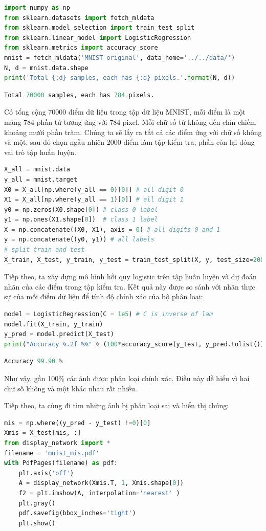 \begin{lstlisting}[language=Python]
import numpy as np 
from sklearn.datasets import fetch_mldata
from sklearn.model_selection import train_test_split
from sklearn.linear_model import LogisticRegression 
from sklearn.metrics import accuracy_score
mnist = fetch_mldata('MNIST original', data_home='../../data/')
N, d = mnist.data.shape
print('Total {:d} samples, each has {:d} pixels.'.format(N, d))
\end{lstlisting}
\kq 
\begin{lstlisting}[language=Python]
Total 70000 samples, each has 784 pixels.
\end{lstlisting}

Có tổng cộng 70000 điểm dữ liệu trong tập dữ liệu MNIST, mỗi điểm là một mảng
784 phần tử tương ứng với 784 pixel. Mỗi chữ số từ không đến chín chiếm khoảng
mười phần trăm. Chúng ta sẽ lấy ra tất cả các điểm ứng với chữ số không và một,
sau đó chọn ngẫu nhiên 2000 điểm làm tập kiểm tra, phần còn lại đóng vai trò
tập huấn luyện.
\begin{lstlisting}[language=Python]
X_all = mnist.data 
y_all = mnist.target
X0 = X_all[np.where(y_all == 0)[0]] # all digit 0
X1 = X_all[np.where(y_all == 1)[0]] # all digit 1
y0 = np.zeros(X0.shape[0]) # class 0 label 
y1 = np.ones(X1.shape[0])  # class 1 label
X = np.concatenate((X0, X1), axis = 0) # all digits 0 and 1 
y = np.concatenate((y0, y1)) # all labels 
# split train and test 
X_train, X_test, y_train, y_test = train_test_split(X, y, test_size=2000)
\end{lstlisting}

Tiếp theo, ta xây dựng mô hình hồi quy logistic trên tập huấn luyện và dự
đoán nhãn của các điểm trong tập kiểm tra. Kết quả này được so sánh với nhãn
thực sự của mỗi điểm dữ liệu để tính độ chính xác của bộ phân loại: 
\begin{lstlisting}[language=Python]
model = LogisticRegression(C = 1e5) # C is inverse of lam 
model.fit(X_train, y_train)
y_pred = model.predict(X_test)
print("Accuracy %.2f %%" % (100*accuracy_score(y_test, y_pred.tolist())))
\end{lstlisting}
\kq
\begin{lstlisting}[language=Python]
Accuracy 99.90 %
\end{lstlisting}
Như vậy, gần 100\% các ảnh được phân loại chính xác. Điều này dễ hiểu vì hai
chữ số không và một khác nhau rất nhiều. 
 
Tiếp theo, ta cùng đi tìm những ảnh bị phân loại sai và hiển thị chúng:
\begin{lstlisting}[language=Python]
mis = np.where((y_pred - y_test) !=0)[0]
Xmis = X_test[mis, :]
from display_network import * 
filename = 'mnist_mis.pdf'
with PdfPages(filename) as pdf:
    plt.axis('off')
    A = display_network(Xmis.T, 1, Xmis.shape[0])
    f2 = plt.imshow(A, interpolation='nearest' )
    plt.gray()
    pdf.savefig(bbox_inches='tight')
    plt.show()
\end{lstlisting}

